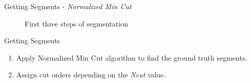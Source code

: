 \documentclass[10pt,xcolor=svgnames]{beamer} %
\begin{document}
\begin{frame}{Getting Segments - \textit{Normalized Min Cut}}
\begin{figure}
    \caption{First three steps of segmentation}
    \label{fig:gridSegmentationExample}
    
\end{figure}
\end{frame}

\begin{frame}{Getting Segments}
\begin{enumerate}
    \item Apply Normalized Min Cut algorithm to find the ground truth segments.
    \item Assign cut orders depending on the \textit{Ncut} value.
\end{enumerate}
\end{frame}
\end{document}

